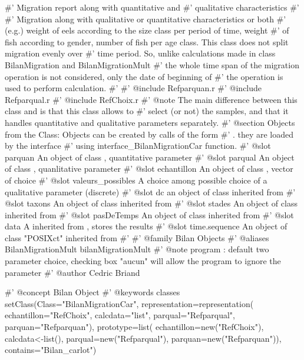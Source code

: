#' Migration report along with quantitative and
#' qualitative characteristics
#' 
#' Migration along with qualitative or quantitative characteristics or both
#' (e.g.) weight of eels according to the size class per period of time, weight
#' of fish according to gender, number of fish per age class. This class does not split migration evenly over 
#' time period. So, unlike calculations made in class BilanMigration and BilanMigrationMult
#' the whole time span of the migration operation is not considered, only  the date of beginning of 
#' the operation is used to perform calculation. 
#' 
#' @include Refparquan.r
#' @include Refparqual.r
#' @include RefChoix.r
#' @note The main difference between this class and  is that this class allows to
#' select (or not) the samples, and that it handles quantitative and qualitative parameters separately.
#' @section Objects from the Class: Objects can be created by calls of the form
#' .  they are loaded by the interface
#' using interface_BilanMigrationCar function.
#' @slot parquan An object of class , quantitative parameter 
#' @slot parqual An object of class , quanlitative parameter
#' @slot echantillon An object of class , vector of choice
#' @slot valeurs_possibles A  choice among possible choice of a qualitative parameter (discrete)
#' @slot dc an object of class  inherited from 
#' @slot taxons An object of class  inherited from 
#' @slot stades An object of class  inherited from 
#' @slot pasDeTemps An object of class  inherited from 
#' @slot data A  inherited from , stores the results
#' @slot time.sequence An object of class "POSIXct" inherited from 
#' #' @family Bilan Objects
#' @aliases BilanMigrationMult bilanMigrationMult
#' @note program : default two parameter choice, checking box "aucun" will allow the program to ignore the parameter
#' @author Cedric Briand 

#' @concept Bilan Object 
#' @keywords classes
setClass(Class="BilanMigrationCar",
		representation=representation(
				echantillon="RefChoix",
				calcdata="list",
				parqual="Refparqual",
				parquan="Refparquan"),
		prototype=list(
				echantillon=new("RefChoix"),
				calcdata<-list(),
				parqual=new("Refparqual"),
				parquan=new("Refparquan")),
		contains="Bilan_carlot")


